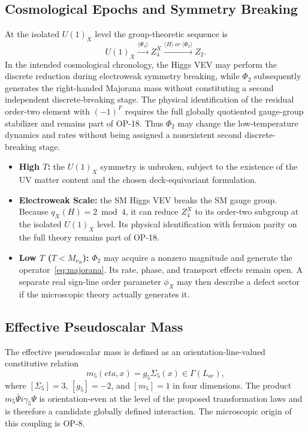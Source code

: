 \documentclass[11pt]{article}
\theoremstyle{canonmath}
\theoremstyle{canonpostulate}
\theoremstyle{canonclaim}
\providecommand{\Lor}{\mathcal L_{\mathrm{or}}}
\def\mathrm#1{#1}%
\def\mathbb#1{#1}%
\def\mathcal#1{#1}%
\def\eta{eta}%
\begin{document}
\subsection{Cosmological Epochs and Symmetry Breaking}

At the isolated $U(1)_X$ level the group-theoretic sequence is
\begin{equation}
U(1)_X
\xrightarrow{\langle\Phi_4\rangle}
\mathbb Z_4^X
\xrightarrow{\langle H\rangle\ \mathrm{or}\ \langle\Phi_2\rangle}
\mathbb Z_2.
\end{equation}
In the intended cosmological chronology, the Higgs VEV may perform the discrete reduction during electroweak symmetry breaking, while $\Phi_2$ subsequently generates the right-handed Majorana mass without constituting a second independent discrete-breaking stage. The physical identification of the residual order-two element with $(-1)^F$ requires the full globally quotiented gauge-group stabilizer and remains part of OP-18. Thus $\Phi_2$ may change the low-temperature dynamics and rates without being assigned a nonexistent second discrete-breaking stage.

\begin{itemize}
\item \textbf{High $T$:} the $U(1)_X$ symmetry is unbroken, subject to the existence of the UV matter content and the chosen deck-equivariant formulation.
\item \textbf{Electroweak Scale:} the SM Higgs VEV breaks the SM gauge group. Because $q_X(H)=2\bmod4$, it can reduce $\mathbb Z_4^X$ to its order-two subgroup at the isolated $U(1)_X$ level. Its physical identification with fermion parity on the full theory remains part of OP-18.
\item \textbf{Low $T$ ($T<M_{\nu_R}$):} $\Phi_2$ may acquire a nonzero magnitude and generate the operator~\eqref{eq:majorana}. Its rate, phase, and transport effects remain open. A separate real sign-line order parameter $\phi_X$ may then describe a defect sector if the microscopic theory actually generates it.
\end{itemize}

\subsection{Effective Pseudoscalar Mass}

The effective pseudoscalar mass is defined as an orientation-line-valued constitutive relation
\begin{equation}
m_5(\eta,x)=g_5\Sigma_5(x)\in\Gamma(\Lor),
\end{equation}
where $[\Sigma_5]=3$, $[g_5]=-2$, and $[m_5]=1$ in four dimensions. The product $m_5\bar\Psi i\gamma_5\Psi$ is orientation-even at the level of the proposed transformation laws and is therefore a candidate globally defined interaction. The microscopic origin of this coupling is OP-8.
\end{document}
